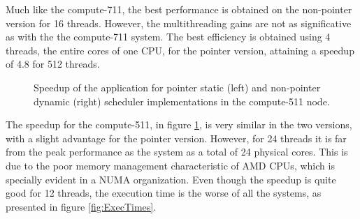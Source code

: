 Much like the compute-711, the best performance is obtained on the non-pointer version for 16 threads. However, the multithreading gains are not as significative as with the the compute-711 system. The best efficiency is obtained using 4 threads, the entire cores of one CPU, for the pointer version, attaining a speedup of 4.8 for 512 threads.

\begin{figure}[!htp]
	\begin{center}
		\caption{Speedup of the \tth application for pointer static (left) and non-pointer dynamic (right) scheduler implementations in the compute-511 node.}
		\label{fig:Speedup511}
	\end{center}
\end{figure}

The speedup for the compute-511, in figure \ref{fig:Speedup511}, is very similar in the two versions, with a slight advantage for the pointer version. However, for 24 threads it is far from the peak performance as the system as a total of 24 physical cores. This is due to the poor memory management characteristic of AMD CPUs, which is specially evident in a NUMA organization. Even though the speedup is quite good for 12 threads, the execution time is the worse of all the systems, as presented in figure \ref{fig:ExecTimes}.

